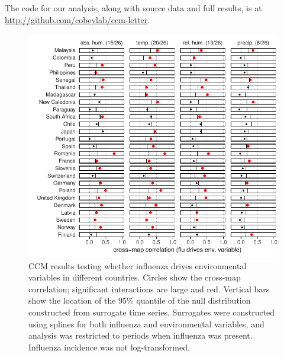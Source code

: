 \documentclass[11pt]{article}
\begin{document}
The code for our analysis, along with source data and full results, is at \\ \url{http://github.com/cobeylab/ccm-letter}.

\begin{figure}
\centering
\includegraphics[width=4.5in]{us=1-rz=1-usf=1-use=1-ulf=0-fic=1-lt=0.pdf}
\caption{
    \label{fig:bycountry}
    CCM results testing whether influenza drives environmental variables in different countries.
    Circles show the cross-map correlation; significant interactions are large and red.
    Vertical bars show the location of the 95\% quantile of the null distribution constructed from surrogate time series.
    Surrogates were constructed using splines for both influenza and environmental variables, and analysis was restricted to periods when influenza was present.
    Influenza incidence was not log-transformed.
}
\end{figure}
\end{document}
